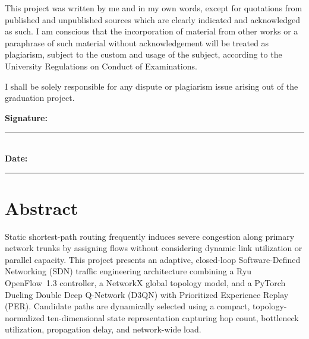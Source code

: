 \documentclass[12pt,a4paper,oneside]{report}
\begin{document}
\vspace{4mm}
\noindent This project was written by me and in my own words, except for quotations from published and unpublished sources which are clearly indicated and acknowledged as such. I am conscious that the incorporation of material from other works or a paraphrase of such material without acknowledgement will be treated as plagiarism, subject to the custom and usage of the subject, according to the University Regulations on Conduct of Examinations.

\vspace{4mm}
\noindent I shall be solely responsible for any dispute or plagiarism issue arising out of the graduation project.

\vspace{25mm}
\noindent\textbf{Signature:} \rule{60mm}{0.4pt}\\[4mm]
\noindent\textbf{Date:} \rule{40mm}{0.4pt}
\clearpage

\setcounter{page}{1}

\chapter*{Abstract}
Static shortest-path routing frequently induces severe congestion along primary network trunks by assigning flows without considering dynamic link utilization or parallel capacity. This project presents an adaptive, closed-loop Software-Defined Networking (SDN) traffic engineering architecture combining a Ryu OpenFlow~1.3 controller, a NetworkX global topology model, and a PyTorch Dueling Double Deep Q-Network (D3QN) with Prioritized Experience Replay (PER). Candidate paths are dynamically selected using a compact, topology-normalized ten-dimensional state representation capturing hop count, bottleneck utilization, propagation delay, and network-wide load.
\end{document}
